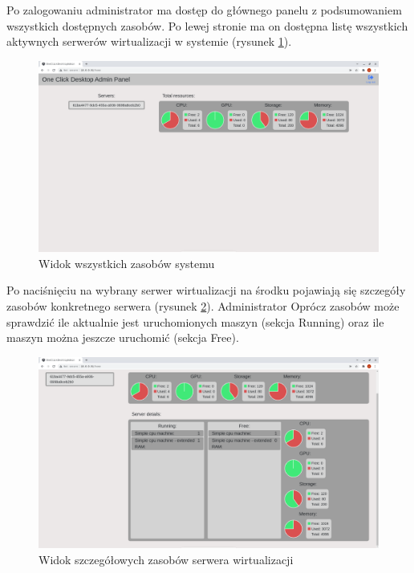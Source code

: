 \documentclass[../opis-rozwiazania.tex]{subfiles}
\begin{document}
Po zalogowaniu administrator ma dostęp do głównego panelu z podsumowaniem wszystkich dostępnych zasobów.
Po lewej stronie ma on dostępna listę wszystkich aktywnych serwerów wirtualizacji w systemie (rysunek \ref{figure:system_interaction.admin.panel}).

\begin{figure}[H]
	\centering
	\includegraphics[width=\textwidth]{resources/admin_panel_home.png}
	\caption{Widok wszystkich zasobów systemu}
	\label{figure:system_interaction.admin.panel}
\end{figure}

Po naciśnięciu na wybrany serwer wirtualizacji na środku pojawiają się szczegóły zasobów konkretnego serwera (rysunek \ref{figure:system_interaction.admin.details}).
Administrator Oprócz zasobów może sprawdzić ile aktualnie jest uruchomionych maszyn (sekcja Running) oraz ile maszyn można jeszcze uruchomić (sekcja Free).

\begin{figure}[H]
	\centering
	\includegraphics[width=\textwidth]{resources/admin_panel_details.png}
	\caption{Widok szczegółowych zasobów serwera wirtualizacji}
	\label{figure:system_interaction.admin.details}
\end{figure}
\end{document}
